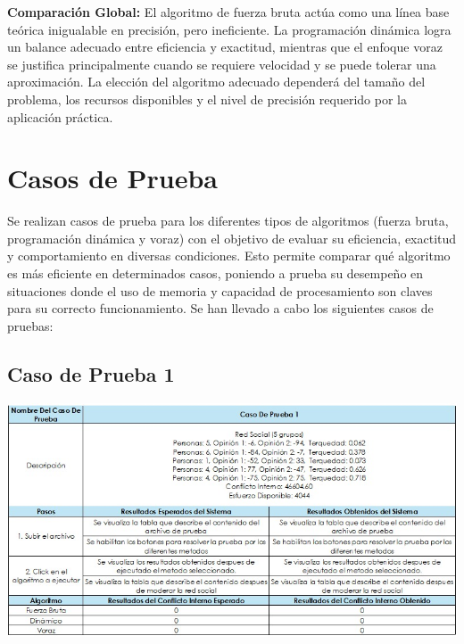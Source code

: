 \documentclass[11pt,letter]{article}
\begin{document}
    \textbf{Comparación Global:} El algoritmo de fuerza bruta actúa como una línea base teórica inigualable en precisión, pero ineficiente. La programación dinámica logra un balance adecuado entre eficiencia y exactitud, mientras que el enfoque voraz se justifica principalmente cuando se requiere velocidad y se puede tolerar una aproximación. La elección del algoritmo adecuado dependerá del tamaño del problema, los recursos disponibles y el nivel de precisión requerido por la aplicación práctica.


    \newpage



    \section{Casos de Prueba}

    Se realizan casos de prueba para los diferentes tipos de algoritmos (fuerza bruta, programación dinámica y voraz) con el objetivo de evaluar su eficiencia, exactitud y comportamiento en diversas condiciones. Esto permite comparar qué algoritmo es más eficiente en determinados casos, poniendo a prueba su desempeño en situaciones donde el uso de memoria y capacidad de procesamiento son claves para su correcto funcionamiento. Se han llevado a cabo los siguientes casos de pruebas:

    \subsection{Caso de Prueba 1}
    \begin{flushleft}
        \includegraphics[width=\linewidth]{resources/cp1.jpeg}
    \end{flushleft}
\end{document}
